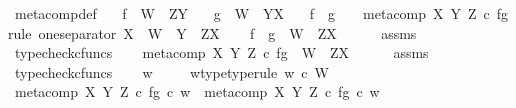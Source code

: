 \begin{isabellebody}
{\isafoldproof}%
%
\isadelimproof
\isanewline
%
\endisadelimproof
\isanewline
{}\isamarkupfalse%
\ meta{\isacharunderscore}{\kern0pt}comp{}{\isacharunderscore}{\kern0pt}def{}{\isacharcolon}{\kern0pt}\isanewline
\ \ \ {\isachardoublequoteopen}f\ {\isacharcolon}{\kern0pt}\ W\ {\isasymrightarrow}\ Z\isactrlbsup Y\isactrlesup {\isachardoublequoteclose}\isanewline
\ \ \ {\isachardoublequoteopen}g\ {\isacharcolon}{\kern0pt}\ W\ {\isasymrightarrow}\ Y\isactrlbsup X\isactrlesup {\isachardoublequoteclose}\isanewline
\ \ \ {\isachardoublequoteopen}f\ {\isasymbox}\ g\ \ \ {\isacharequal}{\kern0pt}\ meta{\isacharunderscore}{\kern0pt}comp\ X\ Y\ Z\ {\isasymcirc}\isactrlsub c\ {\isasymlangle}f{\isacharcomma}{\kern0pt}g{\isasymrangle}{\isachardoublequoteclose}\isanewline
%
\isadelimproof
%
\endisadelimproof
%
\isatagproof
{}\isamarkupfalse%
{\isacharparenleft}{\kern0pt}rule\ one{\isacharunderscore}{\kern0pt}separator{\isacharbrackleft}{\kern0pt}\ X\ {\isacharequal}{\kern0pt}\ W{\isacharcomma}{\kern0pt}\ \ Y\ {\isacharequal}{\kern0pt}\ {\isachardoublequoteopen}Z\isactrlbsup X\isactrlesup {\isachardoublequoteclose}{\isacharbrackright}{\kern0pt}{\isacharparenright}{\kern0pt}\isanewline
\ \ \isamarkupfalse%
\ {\isachardoublequoteopen}f\ {\isasymbox}\ g\ {\isacharcolon}{\kern0pt}\ W\ {\isasymrightarrow}\ Z\isactrlbsup X\isactrlesup {\isachardoublequoteclose}\isanewline
\ \ \ \ \isamarkupfalse%
\ assms\ \isamarkupfalse%
\ typecheck{\isacharunderscore}{\kern0pt}cfuncs\isanewline
\ \ \isamarkupfalse%
\ {\isachardoublequoteopen}meta{\isacharunderscore}{\kern0pt}comp\ X\ Y\ Z\ {\isasymcirc}\isactrlsub c\ {\isasymlangle}f{\isacharcomma}{\kern0pt}g{\isasymrangle}\ {\isacharcolon}{\kern0pt}\ W\ {\isasymrightarrow}\ Z\isactrlbsup X\isactrlesup {\isachardoublequoteclose}\isanewline
\ \ \ \ \isamarkupfalse%
\ assms\ \isamarkupfalse%
\ typecheck{\isacharunderscore}{\kern0pt}cfuncs\isanewline
{}\isamarkupfalse%
\isanewline
\ \ \isamarkupfalse%
\ w\ \isanewline
\ \ \isamarkupfalse%
\ w{\isacharunderscore}{\kern0pt}type{\isacharbrackleft}{\kern0pt}type{\isacharunderscore}{\kern0pt}rule{\isacharbrackright}{\kern0pt}{\isacharcolon}{\kern0pt}\ {\isachardoublequoteopen}w\ {\isasymin}\isactrlsub c\ W{\isachardoublequoteclose}\isanewline
\ \ \isamarkupfalse%
\ {\isachardoublequoteopen}{\isacharparenleft}{\kern0pt}meta{\isacharunderscore}{\kern0pt}comp\ X\ Y\ Z\ {\isasymcirc}\isactrlsub c\ {\isasymlangle}f{\isacharcomma}{\kern0pt}g{\isasymrangle}{\isacharparenright}{\kern0pt}\ {\isasymcirc}\isactrlsub c\ w\ {\isacharequal}{\kern0pt}\ meta{\isacharunderscore}{\kern0pt}comp\ X\ Y\ Z\ {\isasymcirc}\isactrlsub c\ {\isasymlangle}f{\isacharcomma}{\kern0pt}g{\isasymrangle}\ {\isasymcirc}\isactrlsub c\ w{\isachardoublequoteclose}\isanewline

\end{isabellebody}
